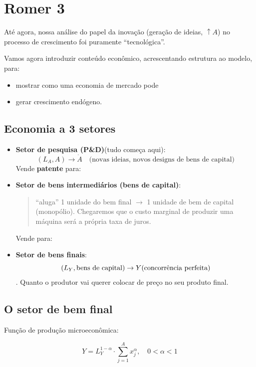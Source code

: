 \documentclass[a4paper,12pt]{article}[abntex2]
\begin{document}
\newpage
\section{\textbf{Romer 3}}

Até agora, nossa análise do papel da inovação (geração de ideias, $\uparrow A$) no processo de crescimento foi puramente ``tecnológica''.

Vamos agora introduzir conteúdo econômico, acrescentando estrutura ao modelo, para:

\begin{itemize}
  \item mostrar como uma economia de mercado pode
  \item gerar crescimento endógeno.
\end{itemize}

\subsection{\textbf{Economia a 3 setores}}

\begin{itemize}
  \item \textbf{Setor de pesquisa (P\&D)}(tudo começa aqui):
  \[
  (L_A, A) \rightarrow \dot{A} \quad \text{(novas ideias, novos designs de bens de capital)}
  \]
  Vende \textbf{patente} para:
  
  \item \textbf{Setor de bens intermediários (bens de capital)}:
  \begin{quote}
    ``aluga'' 1 unidade do bem final $\rightarrow$ 1 unidade de bem de capital \hfill (monopólio). Chegaremos que o custo marginal de produzir uma máquina será a própria taxa de juros.
  \end{quote}
  Vende para:
  
  \item \textbf{Setor de bens finais}:
  \[
  (L_Y, \text{bens de capital}) \rightarrow Y \hfill \text{(concorrência perfeita)}
  \]. Quanto o produtor vai querer colocar de preço no seu produto final.
\end{itemize}

\subsection{\textbf{O setor de bem final}}

Função de produção microeconômica:

\begin{equation}
Y = L_Y^{1 - \alpha} \cdot \sum_{j=1}^{A} x_j^{\alpha}, \quad 0 < \alpha < 1 \tag{10}
\end{equation}
\end{document}
